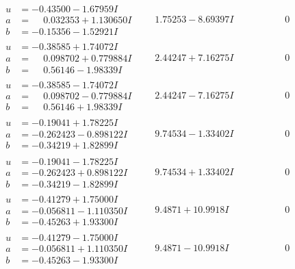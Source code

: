 \documentclass[1p]{elsarticle_modified}
\theoremstyle{definition}
\begin{document}
$$\begin{array}{c|c|c}
\begin{aligned}
u &= -0.43500 - 1.67959 I \\
a &= \phantom{-}0.032353 + 1.130650 I \\
b &= -0.15356 - 1.52921 I\end{aligned}
 & \phantom{-}1.75253 - 8.69397 I & \phantom{-0.000000 } 0 \\ \hline\begin{aligned}
u &= -0.38585 + 1.74072 I \\
a &= \phantom{-}0.098702 + 0.779884 I \\
b &= \phantom{-}0.56146 - 1.98339 I\end{aligned}
 & \phantom{-}2.44247 + 7.16275 I & \phantom{-0.000000 } 0 \\ \hline\begin{aligned}
u &= -0.38585 - 1.74072 I \\
a &= \phantom{-}0.098702 - 0.779884 I \\
b &= \phantom{-}0.56146 + 1.98339 I\end{aligned}
 & \phantom{-}2.44247 - 7.16275 I & \phantom{-0.000000 } 0 \\ \hline\begin{aligned}
u &= -0.19041 + 1.78225 I \\
a &= -0.262423 - 0.898122 I \\
b &= -0.34219 + 1.82899 I\end{aligned}
 & \phantom{-}9.74534 - 1.33402 I & \phantom{-0.000000 } 0 \\ \hline\begin{aligned}
u &= -0.19041 - 1.78225 I \\
a &= -0.262423 + 0.898122 I \\
b &= -0.34219 - 1.82899 I\end{aligned}
 & \phantom{-}9.74534 + 1.33402 I & \phantom{-0.000000 } 0 \\ \hline\begin{aligned}
u &= -0.41279 + 1.75000 I \\
a &= -0.056811 - 1.110350 I \\
b &= -0.45263 + 1.93300 I\end{aligned}
 & \phantom{-}9.4871 + 10.9918 I & \phantom{-0.000000 } 0 \\ \hline\begin{aligned}
u &= -0.41279 - 1.75000 I \\
a &= -0.056811 + 1.110350 I \\
b &= -0.45263 - 1.93300 I\end{aligned}
 & \phantom{-}9.4871 - 10.9918 I & \phantom{-0.000000 } 0 \\ \hline\begin{aligned}

\end{aligned}
\end{array}$$
\end{document}
